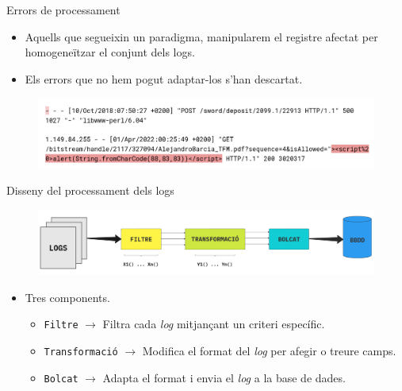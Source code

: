 \begin{frame}{Errors de processament}
    \begin{itemize}%
        \item Aquells que segueixin un paradigma, manipularem el registre afectat per homogeneïtzar el conjunt dels logs.
        \item Els errors que no hem pogut adaptar-los s'han descartat.
    \end{itemize}
    \begin{figure}[htbp]
        \centerline{\includegraphics[width=\textwidth]{figures/log-error}}
        \label{fig:log-error}
    \end{figure}
\end{frame}

\begin{frame}{Disseny del processament dels logs}

    \begin{figure}
        \includegraphics[width=\textwidth]{figures/log-processing}
        \label{fig:log-processing}
    \end{figure}

    \begin{itemize}%
        \item Tres components.
        \begin{itemize}%
            \item \texttt{Filtre} \(\rightarrow\) Filtra cada \textit{log} mitjançant un criteri específic.
            \item \texttt{Transformació} \(\rightarrow\) Modifica el format del \textit{log} per afegir o treure camps.
            \item \texttt{Bolcat} \(\rightarrow\) Adapta el format i envia el \textit{log} a la base de dades.
        \end{itemize}
    \end{itemize}
\end{frame}


